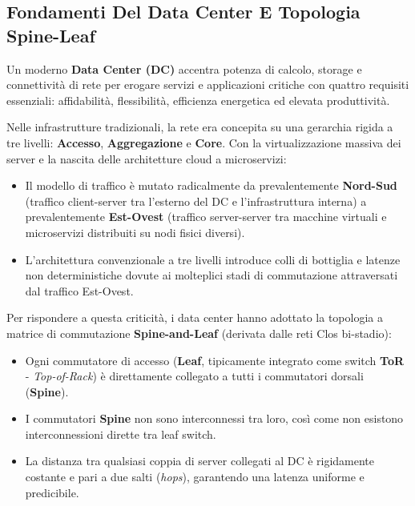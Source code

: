 \documentclass[11pt, a4paper]{article}
\begin{document}
\subsection{Fondamenti Del Data Center E Topologia Spine-Leaf}
Un moderno \textbf{Data Center (DC)} accentra potenza di calcolo, storage e connettività di rete per erogare servizi e applicazioni critiche con quattro requisiti essenziali: affidabilità, flessibilità, efficienza energetica ed elevata produttività.


Nelle infrastrutture tradizionali, la rete era concepita su una gerarchia rigida a tre livelli: \textbf{Accesso}, \textbf{Aggregazione} e \textbf{Core}. Con la virtualizzazione massiva dei server e la nascita delle architetture cloud a microservizi:
\begin{itemize}[noitemsep]
    \item Il modello di traffico è mutato radicalmente da prevalentemente \textbf{Nord-Sud} (traffico client-server tra l'esterno del DC e l'infrastruttura interna) a prevalentemente \textbf{Est-Ovest} (traffico server-server tra macchine virtuali e microservizi distribuiti su nodi fisici diversi).
    \item L'architettura convenzionale a tre livelli introduce colli di bottiglia e latenze non deterministiche dovute ai molteplici stadi di commutazione attraversati dal traffico Est-Ovest.
\end{itemize}

Per rispondere a questa criticità, i data center hanno adottato la topologia a matrice di commutazione \textbf{Spine-and-Leaf} (derivata dalle reti Clos bi-stadio):
\begin{itemize}[noitemsep]
    \item Ogni commutatore di accesso (\textbf{Leaf}, tipicamente integrato come switch \textbf{ToR} - \emph{Top-of-Rack}) è direttamente collegato a tutti i commutatori dorsali (\textbf{Spine}).
    \item I commutatori \textbf{Spine} non sono interconnessi tra loro, così come non esistono interconnessioni dirette tra leaf switch.
    \item La distanza tra qualsiasi coppia di server collegati al DC è rigidamente costante e pari a due salti (\emph{hops}), garantendo una latenza uniforme e predicibile.
\end{itemize}
\end{document}
